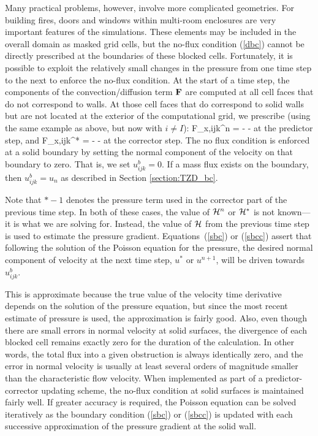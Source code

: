 Many practical problems, however, involve more
complicated geometries. For building fires,
doors and windows within multi-room enclosures are very important features
of the simulations. These elements may be included
in the overall domain as masked grid cells,
but the no-flux condition (\ref{dbc}) cannot be directly prescribed
at the boundaries of these blocked cells.
Fortunately, it is possible to exploit
the relatively small changes in the pressure from one time
step to the next to enforce the no-flux condition.
At the start of a time step,
the components of the convection/diffusion term ${\mathbf{F}}$ are computed
at all cell faces that do not correspond to walls.
At those cell faces that do correspond to solid walls but are not located at the exterior of the
computational grid, we prescribe (using the same example as above, but now with $i \ne I$):
\be
F_{x,ijk}^n = -  -  \label{sbc}
\ee
at the predictor step, and
\be
F_{x,ijk}^* = -  -  \label{sbcc}
\ee
at the corrector step.  The no flux condition is enforced at a solid boundary by setting the normal component of the velocity on that boundary to zero.  That is, we set $u_{ijk}^b = 0$.  If a mass flux exists on the boundary, then $u_{ijk}^b = u_n$ as described in Section \ref{section:TZD_bc}.

Note that $*-1$ denotes the pressure term used in the corrector part of the
previous time step. In both of these cases, the value of $\mathcal{H}^n$ or $\mathcal{H}^*$ is not known---it is what we are solving for.
Instead, the value of $\mathcal{H}$ from the previous time step is used to estimate the pressure gradient.
Equations~(\ref{sbc}) or (\ref{sbcc}) assert that following the solution of the Poisson
equation for the pressure, the desired normal component of velocity at the next time step, $u^*$ or $u^{n+1}$, will
be driven towards $u_{ijk}^b$.

This is approximate because the true value of the velocity time
derivative depends on the solution of the pressure equation, but since
the most recent estimate of pressure is used, the approximation is fairly
good. Also, even though there are small errors in normal velocity at solid
surfaces, the divergence of each blocked cell
remains exactly zero for the duration of the calculation.
In other words, the total flux into a given obstruction is always identically
zero, and the error in normal velocity is usually at least
several orders of magnitude smaller than the characteristic flow velocity.
When implemented as part of a predictor-corrector updating scheme,
the no-flux condition at solid surfaces is maintained fairly well. If greater accuracy is
required, the Poisson equation can be solved iteratively as the boundary condition (\ref{sbc}) or (\ref{sbcc}) is updated with
each successive approximation of the pressure gradient at the solid wall.




